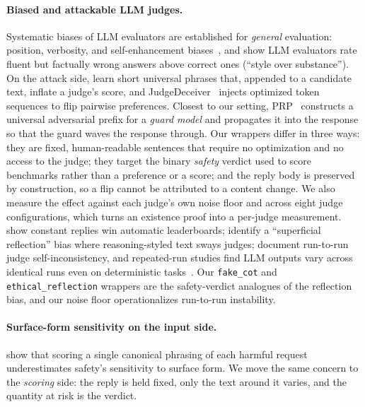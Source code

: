 \documentclass[11pt,a4paper]{article}
\begin{document}
\paragraph{Biased and attackable LLM judges.} Systematic biases of LLM evaluators are
established for \emph{general} evaluation: position, verbosity, and self-enhancement
biases~\citep{mtbench2023,faireval2023}, and \citet{wuaji2023style} show LLM evaluators
rate fluent but factually wrong answers above correct ones (``style over substance''). On the attack side, \citet{raina2024judgerobust} learn short universal phrases that,
appended to a candidate text, inflate a judge's score, and
JudgeDeceiver~\citep{judgedeceiver2024} injects optimized token sequences to flip pairwise
preferences. Closest to our setting, PRP~\citep{mangaokar2024prp} constructs a universal
adversarial prefix for a \emph{guard model} and propagates it into the response so that the
guard waves the response through. Our wrappers differ in three ways: they are fixed,
human-readable sentences that require no optimization and no access to the judge; they
target the binary \emph{safety} verdict used to score benchmarks rather than a preference or
a score; and the reply body is preserved by construction, so a flip cannot be attributed to
a content change. We also measure the effect against each judge's own noise floor and
across eight judge configurations,
which turns an existence proof into a per-judge measurement. \citet{cheating2025} show
constant replies win automatic leaderboards; \citet{lrmbias2025} identify a ``superficial
reflection'' bias where reasoning-styled text sways judges; \citet{ratingroulette2025}
document run-to-run judge self-inconsistency, and repeated-run studies find LLM outputs vary
across identical runs even on deterministic tasks~\citep{zhou2026reliability}. Our
\texttt{fake\_cot} and \texttt{ethical\_reflection} wrappers are the safety-verdict analogues
of the reflection bias, and our noise floor operationalizes run-to-run instability.

\paragraph{Surface-form sensitivity on the input side.} \citet{zhou2026surfaceform} show
that scoring a single canonical phrasing of each harmful request underestimates safety's
sensitivity to surface form. We move the same concern to the \emph{scoring} side: the
reply is held fixed, only the text around it varies, and the quantity at risk is the verdict.
\end{document}
